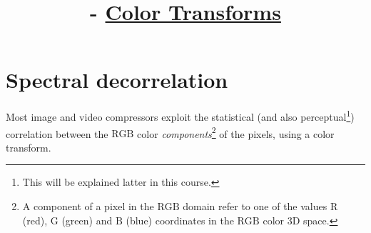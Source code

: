 
%


\title{\SM{} - \href{https://github.com/Sistemas-Multimedia/Sistemas-Multimedia.github.io/tree/master/contents/color_transforms}{Color Transforms}}

\maketitle
\tableofcontents

\section{Spectral decorrelation}

Most image and video compressors exploit the statistical (and also
perceptual\footnote{This will be explained latter in this course.})
correlation between the $\text{RGB}$ color
\emph{components}\footnote{A component of a pixel in the $\text{RGB}$
domain refer to one of the values $\text{R}$ (red), $\text{G}$ (green)
and $\text{B}$ (blue) coordinates in the $\text{RGB}$ color 3D space.}
of the pixels, using a color transform.

